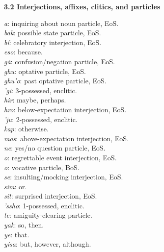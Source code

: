 \documentclass{article}[10pt]
\begin{document}
{\bf 3.2 Interjections, affixes, clitics, and particles}
\begin{multicols}{2}
\noindent
\emph{a}: inquiring about noun particle, EoS.\\
\emph{bak}: possible state particle, EoS.\\
\emph{b\'{i}}: celebratory interjection, EoS.\\
\emph{eso}: because.\\
\emph{g\.{a}}: confusion/negation particle, EoS.\\
\emph{ghu}: optative particle, EoS.\\
\emph{ghu'o}: past optative particle, EoS.\\
\emph{'gi}: 3-possessed, enclitic.\\
\emph{hir}: maybe, perhaps.\\
\emph{hro}: below-expectation interjection, EoS.\\
\emph{'ju}: 2-possessed, enclitic.\\
\emph{kap}: otherwise.\\
\emph{mas}: above-expectation interjection, EoS.\\
\emph{ne}: yes/no question particle, EoS.\\
\emph{o}: regrettable event interjection, EoS.\\
\emph{o}: vocative particle, BoS.\\
\emph{se}: insulting/mocking interjection, EoS.\\
\emph{sim}: or.\\
\emph{sit}: surprised interjection, EoS.\\
\emph{'ssho}: 1-possessed, enclitic.\\
\emph{te}: amiguity-clearing particle.\\
\emph{yak}: so, then.\\
\emph{ye}: that.\\
\emph{yisa}: but, however, although.\\
\end{multicols}
\end{document}
